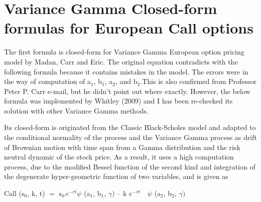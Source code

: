 \section{Variance Gamma Closed-form formulas for European Call 
options}

The first formula is closed-form for Variance Gamma European option pricing 
model by Madan, Carr and Eric. The original equation contradicts with the 
following formula because it contains mistakes in the model. The errors were 
in the way of computation of a$_{1}$, b$_{1}$, a$_{2}$, and b$_{2}$.This is 
also confirmed from Professor Peter P. Carr e-mail, but he didn't point out 
where exactly. However, the below formula was implemented by Whitley (2009) 
and I has been re-checked its solution with other Variance Gamma methods.

Its closed-form is originated from the Classic Black-Scholes model and 
adapted to the conditional normality of the process and the Variance Gamma 
process as drift of Brownian motion with time span from a Gamma distribution 
and the risk neutral dynamic of the stock price. As a result, it uses a high 
computation process, due to the modified Bessel function of the second kind 
and integration of the degenerate hyper-geometric function of two variables, 
and is given as

\begin{center}
Call (s$_{0}$, k, t) $=$ s$_{0\, }e^{-rt}\psi $ (a$_{1}$, b$_{1}$, 
$\gamma )$ -- k $e^{-rt} \quad \psi $ (a$_{2}$, b$_{2}$, $\gamma )$
\end{center}

